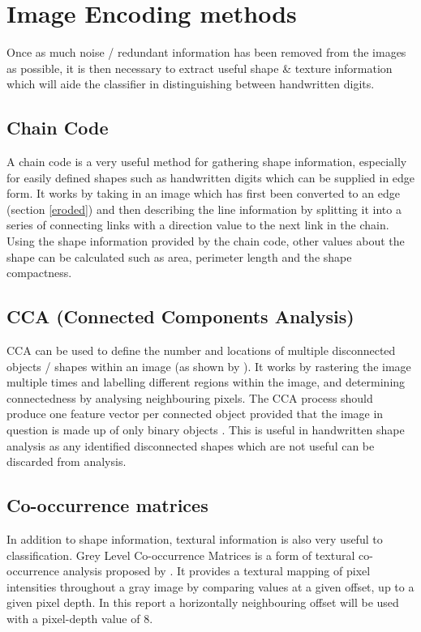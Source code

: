 \documentclass[12pt]{article}
\begin{document}
\section{Image Encoding methods} \label{encoding}
  Once as much noise / redundant information has been removed from the images as possible, it is then necessary to extract useful shape \& texture information which will aide the classifier in distinguishing between handwritten digits.

  \subsection{Chain Code} \label{chain-code}
   A chain code \citep{freeman1961encoding} is a very useful method for gathering shape information, especially for easily defined shapes such as handwritten digits which can be supplied in edge form. It works by taking in an image which has first been converted to an edge (section \ref{eroded}) and then describing the line information by splitting it into a series of connecting links with a direction value to the next link in the chain. Using the shape information provided by the chain code, other values about the shape can be calculated such as area, perimeter length and the shape compactness.

  \subsection{CCA (Connected Components Analysis)}
    CCA can be used to define the number and locations of multiple disconnected objects / shapes within an image (as shown by \cite{rosenfeld1966sequential}). It works by rastering the image multiple times and labelling different regions within the image, and determining connectedness by analysing neighbouring pixels. The CCA process should produce one feature vector per connected object provided that the image in question is made up of only binary objects \citep{cca}. This is useful in handwritten shape analysis as any identified disconnected shapes which are not useful can be discarded from analysis.

  \subsection{Co-occurrence matrices}
    In addition to shape information, textural information is also very useful to classification. Grey Level Co-occurrence Matrices is a form of textural co-occurrence analysis proposed by \cite{haralick1973textural}. It provides a textural mapping of pixel intensities throughout a gray image by comparing values at a given offset, up to a given pixel depth. In this report a horizontally neighbouring offset will be used with a pixel-depth value of 8.
\end{document}
